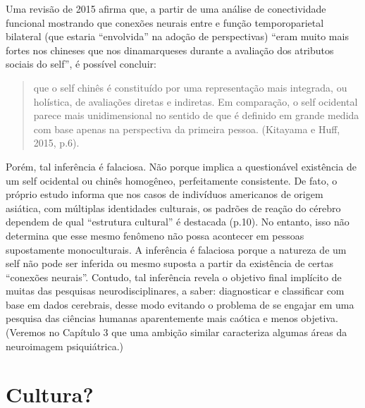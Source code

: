 Uma revisão de 2015 afirma que, a partir de uma análise de conectividade
funcional mostrando que conexões neurais entre  e função
temporoparietal bilateral (que estaria ``envolvida'' na adoção de
perspectivas) ``eram muito mais fortes nos chineses que nos
dinamarqueses durante a avaliação dos atributos sociais do self'', é
possível concluir:

\begin{quote}
que o self chinês é constituído por uma representação mais integrada, ou
holística, de avaliações diretas e indiretas. Em comparação, o self
ocidental parece mais unidimensional no sentido de que é definido em
grande medida com base apenas na perspectiva da primeira pessoa.
(Kitayama e Huff, 2015, p.6).
\end{quote}

Porém, tal inferência é falaciosa. Não porque implica a questionável
existência de um self ocidental ou chinês homogêneo, perfeitamente
consistente. De fato, o próprio estudo informa que nos casos de
indivíduos americanos de origem asiática, com múltiplas identidades
culturais, os padrões de reação do cérebro dependem de qual ``estrutura
cultural'' é destacada (p.10). No entanto, isso não determina que esse
mesmo fenômeno não possa acontecer em pessoas supostamente
monoculturais. A inferência é falaciosa porque a natureza de um self não
pode ser inferida ou mesmo suposta a partir da existência de certas
``conexões neurais''. Contudo, tal inferência revela o objetivo final
implícito de muitas das pesquisas neurodisciplinares, a saber:
diagnosticar e classificar com base em dados cerebrais, desse modo
evitando o problema de se engajar em uma pesquisa das ciências humanas
aparentemente mais caótica e menos objetiva. (Veremos no Capítulo 3 que
uma ambição similar caracteriza algumas áreas da neuroimagem
psiquiátrica.)

\chapter{Cultura?}

